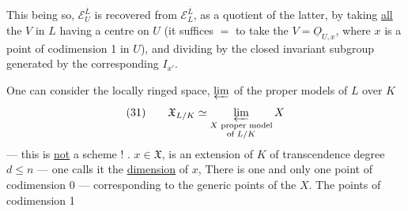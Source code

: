 This being so, $\mathcal E_U^{\overline L}$ is recovered from $\mathcal E_L^{\overline L}$, as a quotient of the latter, by taking \uline{all} the $V$ in $L$ having a centre on $U$ (it suffices $=$ to take the $V=\underline{O}_{U,x}$, where $x$ is a point of codimension 1 in $U$), and dividing by the closed invariant subgroup generated by the corresponding $I_{x'}$.

One can consider the locally ringed space, $\varprojlim$ of the  proper models of $L$ over $K$
\[
(31)\qquad\mathfrak X_{L/K}\simeq\varprojlim_{\substack{X\text{ proper model}\\\text{of }L/K}}X
\]
--- this is \uline{not} a scheme ! .  
$x\in\mathfrak X$,   is an extension of $K$ of transcendence degree $d\leq n$ --- one calls it the \uline{dimension} of $x$,  There is one and only one point of codimension 0 --- corresponding to the generic points of the $X$. The points of codimension 1
